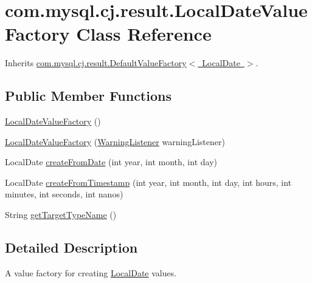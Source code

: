 \hypertarget{classcom_1_1mysql_1_1cj_1_1result_1_1_local_date_value_factory}{}\section{com.\+mysql.\+cj.\+result.\+Local\+Date\+Value\+Factory Class Reference}
\label{classcom_1_1mysql_1_1cj_1_1result_1_1_local_date_value_factory}


Inherits \mbox{\hyperlink{classcom_1_1mysql_1_1cj_1_1result_1_1_default_value_factory}{com.\+mysql.\+cj.\+result.\+Default\+Value\+Factory$<$ Local\+Date $>$}}.

\subsection*{Public Member Functions}
\begin{DoxyCompactItemize}
\item 
\mbox{\hyperlink{classcom_1_1mysql_1_1cj_1_1result_1_1_local_date_value_factory_ab3bb1f581c5bc78541bfbaec3f35de03}{Local\+Date\+Value\+Factory}} ()
\item 
\mbox{\hyperlink{classcom_1_1mysql_1_1cj_1_1result_1_1_local_date_value_factory_ab6bac9e36517357a2d37267a8df27766}{Local\+Date\+Value\+Factory}} (\mbox{\hyperlink{interfacecom_1_1mysql_1_1cj_1_1_warning_listener}{Warning\+Listener}} warning\+Listener)
\item 
Local\+Date \mbox{\hyperlink{classcom_1_1mysql_1_1cj_1_1result_1_1_local_date_value_factory_af0460a8c155945d8f2ab4eca9ca758af}{create\+From\+Date}} (int year, int month, int day)
\item 
Local\+Date \mbox{\hyperlink{classcom_1_1mysql_1_1cj_1_1result_1_1_local_date_value_factory_af50202396d13dee7c69c2d92f2c1b80f}{create\+From\+Timestamp}} (int year, int month, int day, int hours, int minutes, int seconds, int nanos)
\item 
String \mbox{\hyperlink{classcom_1_1mysql_1_1cj_1_1result_1_1_local_date_value_factory_af5c369a382c0adc08ed7e768c5041dc5}{get\+Target\+Type\+Name}} ()
\end{DoxyCompactItemize}


\subsection{Detailed Description}
A value factory for creating \mbox{\hyperlink{}{Local\+Date}} values. 

